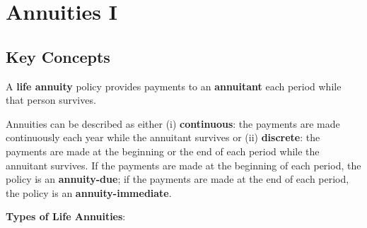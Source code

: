 \documentclass[]{book}
\begin{document}
\chapter{Annuities I}\label{annuities-i}

\section{Key Concepts}\label{key-concepts-1}

A \textbf{life annuity} policy provides payments to an
\textbf{annuitant} each period while that person survives.

Annuities can be described as either (i) \textbf{continuous}: the
payments are made continuously each year while the annuitant survives or
(ii) \textbf{discrete}: the payments are made at the beginning or the
end of each period while the annuitant survives. If the payments are
made at the beginning of each period, the policy is an
\textbf{annuity-due}; if the payments are made at the end of each
period, the policy is an \textbf{annuity-immediate}.

\textbf{Types of Life Annuities}:
\end{document}
